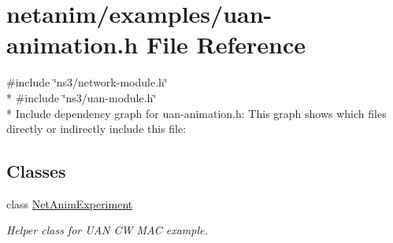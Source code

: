 \hypertarget{uan-animation_8h}{}\section{netanim/examples/uan-\/animation.h File Reference}
\label{uan-animation_8h}
{\ttfamily \#include \char`\"{}ns3/network-\/module.\+h\char`\"{}}\\*
{\ttfamily \#include \char`\"{}ns3/uan-\/module.\+h\char`\"{}}\\*
Include dependency graph for uan-\/animation.h\+:
This graph shows which files directly or indirectly include this file\+:
\subsection*{Classes}
\begin{DoxyCompactItemize}
\item 
class \hyperlink{classNetAnimExperiment}{Net\+Anim\+Experiment}
\begin{DoxyCompactList}\small\item\em Helper class for U\+AN CW M\+AC example. \end{DoxyCompactList}\end{DoxyCompactItemize}
